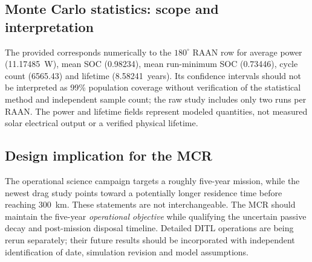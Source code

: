 \subsection{Monte Carlo statistics: scope and interpretation}
The provided  corresponds numerically to the $180^\circ$ RAAN row for average power (11.17485~W), mean SOC (0.98234), mean run-minimum SOC (0.73446), cycle count (6565.43) and lifetime (8.58241~years). Its confidence intervals should not be interpreted as 99\% population coverage without verification of the statistical method and independent sample count; the raw study includes only two runs per RAAN. The power and lifetime fields represent modeled quantities, not measured solar electrical output or a verified physical lifetime.

\subsection{Design implication for the MCR}
The operational science campaign targets a roughly five-year mission, while the newest drag study points toward a potentially longer residence time before reaching 300~km. These statements are not interchangeable. The MCR should maintain the five-year \emph{operational objective} while qualifying the uncertain passive decay and post-mission disposal timeline. Detailed DITL operations are being rerun separately; their future results should be incorporated with independent identification of date, simulation revision and model assumptions.
